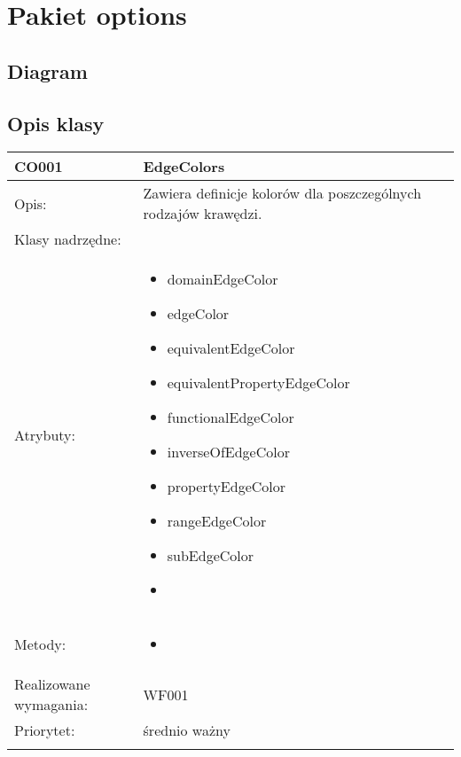 \documentclass[a4paper,10pt]{article}
\begin{document}
\section{Pakiet options}

\subsection{Diagram}

\subsection{Opis klasy}

\begin{center}
 


\begin{longtable}{|m{3cm}|m{9cm}|} \hline

CO001 & EdgeColors \\ \hline
Opis: & Zawiera definicje kolorów dla poszczególnych rodzajów krawędzi.   \\ \hline
Klasy nadrzędne: &     \\ \hline
Atrybuty: & \begin{itemize}
 \item domainEdgeColor
 \item edgeColor
 \item equivalentEdgeColor
 \item equivalentPropertyEdgeColor
 \item functionalEdgeColor
 \item inverseOfEdgeColor
 \item propertyEdgeColor
 \item rangeEdgeColor
 \item subEdgeColor
 \item 
\end{itemize}
 \\ \hline
Metody: & \begin{itemize}
 \item 
\end{itemize}
  \\ \hline
Realizowane wymagania: & WF001 \\ \hline
Priorytet: & średnio ważny \\ \hline

\multicolumn{2}{c}{} \\
 \hline


\end{longtable}
\end{center}
\end{document}
